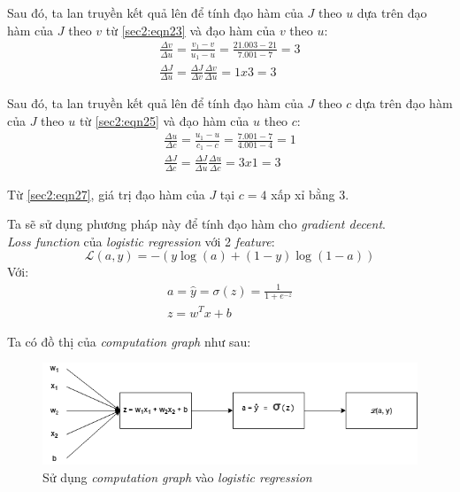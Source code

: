 Sau đó, ta lan truyền kết quả lên để tính đạo hàm của $J$ theo $u$ dựa trên đạo hàm của $J$ theo $v$ từ \ref{sec2:eqn23} và đạo hàm của $v$ theo $u$:
\begin{align}
\frac{\Delta v}{\Delta u} = \frac{v_{1} - v}{u_{1} - u} = \frac{21.003-21}{7.001-7} = 3\\
\label{sec2:eqn25}
\frac{\Delta J}{\Delta u} = \frac{\Delta J}{\Delta v}\frac{\Delta v}{\Delta u} = 1x3 = 3
\end{align}

Sau đó, ta lan truyền kết quả lên để tính đạo hàm của $J$ theo $c$ dựa trên đạo hàm của $J$ theo $u$ từ \ref{sec2:eqn25} và đạo hàm của $u$ theo $c$:
\begin{align}
\frac{\Delta u}{\Delta c} = \frac{u_{1} - u}{c_{1} - c} = \frac{7.001-7}{4.001-4} = 1\\
\label{sec2:eqn27}
\frac{\Delta J}{\Delta c} = \frac{\Delta J}{\Delta u}\frac{\Delta u}{\Delta c} = 3x1=3
\end{align}

Từ \ref{sec2:eqn27}, giá trị đạo hàm của $J$ tại $c=4$ xấp xỉ bằng 3.

Ta sẽ sử dụng phương pháp này để tính đạo hàm cho \textit{gradient decent}.\\ \textit{Loss function} của \textit{logistic regression} với 2 \textit{feature}:
\begin{equation}
\label{sec2:eqn28}
\mathcal{L}(a, y) = -(y\log (a) + (1-y)\log (1-a))
\end{equation}
Với:
\begin{align}
a = \hat{y} = \sigma (z) = \frac{1}{1+e^{-z}}\\
z = w^{T}x + b
\end{align}

Ta có đồ thị của \textit{computation graph} như sau:
\begin{figure}[!h]
\centerline{\includegraphics[scale=0.5]{books/artificial-neural-network/chapter02/figure/com_2.png}}
\caption{Sử dụng \textit{computation graph} vào \textit{logistic regression}}
\label{fig:com_2}
\end{figure}


